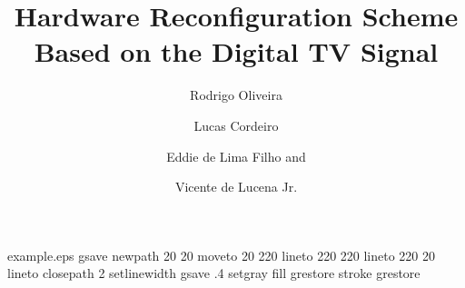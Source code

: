 %
%
%
%
%
\begin{filecontents*}{example.eps}
gsave
newpath
  20 20 moveto
  20 220 lineto
  220 220 lineto
  220 20 lineto
closepath
2 setlinewidth
gsave
  .4 setgray fill
grestore
stroke
grestore
\end{filecontents*}
%
\RequirePackage{fix-cm}
%
\documentclass[smallextended]{svjour3}       %
%
\smartqed  %
%
\usepackage{graphicx}
%
%
%
%
%


\title{Hardware Reconfiguration Scheme Based on the Digital TV Signal%
}


\author{Rodrigo Oliveira \and
        Lucas Cordeiro \and
				Eddie de Lima Filho and \and %
				Vicente de Lucena Jr. \and
}


